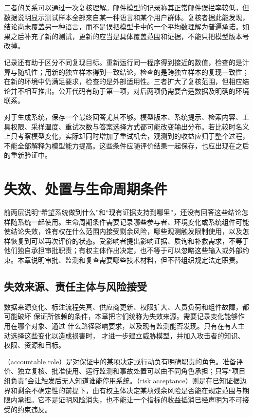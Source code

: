 二者的关系可以通过一次复核理解。邮件模型的记录称其正常邮件误拦率较低，但数据说明显示测试样本全部来自某一种语言和某个用户群体。复核者据此能发现，结论尚未覆盖另一种语言，而不是误把模型卡中的一个平均数理解为普遍承诺。如果之后补充了新的测试，更新的应当是具体覆盖范围和证据，不能只把模型版本号改掉。

记录还有助于区分不同复现目标。重新运行同一程序得到接近的数值，检查的是计算与随机性；用新的独立样本得到一致结论，检查的是跨独立样本的复现一致性；在新的环境中仍满足要求，检查的是外部适用性。三者扩大了复核范围，但相应结论并不相互推出。公开代码有助于第一项，对后两项仍需要合适数据及明确的环境联系。

对于生成系统，保存一个最终回答尤其不够。模型版本、系统提示、检索内容、工具权限、采样温度、重试次数与答案选择方式都可能改变输出分布。若比较时名义上只考察模型变化，实际却同时增加了重试机会，观测到的收益应归于整个过程，不能全部解释为模型能力提高。这些条件应随评价结果一起保存，也应出现在之后的重新验证中。

\section{失效、处置与生命周期条件}
\label{sec:trust-lifecycle}

前两层说明“希望系统做到什么”和“现有证据支持到哪里”，还没有回答这些结论怎样随系统一起使用。生命周期条件需要记录哪些参与者、环境变化或系统组件可能使结论失效，谁有权在什么范围内接受剩余风险，哪些观测触发限制使用，以及怎样恢复到可以再次评价的状态。受影响者提出影响证据、质询和补救需求，不等于他们独自承担审批职责；有权主体作出决定，也不等于可以忽略这些输入或外部约束。本章说明审批、监测和复查需要哪些技术材料，但不替组织规定法定职责。

\subsection{失效来源、责任主体与风险接受}

数据来源变化、标注流程失真、供应商更新、权限扩大、人员负荷和组件故障，都可能破坏
保证所依赖的条件，本章把它们统称为失效来源。需要记录变化能够作用在哪个对象、通过
什么路径影响要求，以及现有监测能否发现。只有在有人主动选择这些变化以造成损害时，
才进一步建立威胁模型，并加入攻击者的知识、权限、资源和目标。

（accountable role）是对保证中的某项决定或行动负有明确职责的角色。准备评价、独立复核、批准使用、运行监测和事故处置可以由不同角色承担；只写“项目组负责”会让触发后无人知道谁能停用系统。（risk acceptance）则是在已知证据边界和剩余不确定性的前提下，由有权主体决定某项残余风险是否能在规定范围与期限内承担。它不是证明风险消失，也不能让一个指标的收益抵消已经声明为不可接受的约束违反。

